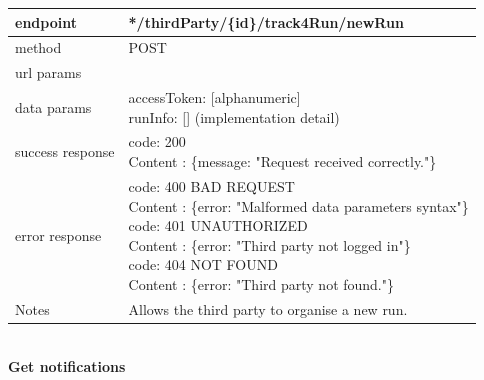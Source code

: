 \begin{legal}
\begin{legal}
\begin{itemize}
								\begin{tabularx}{\linewidth}{| l | l |}
									\hline
									endpoint & */thirdParty/\{id\}/track4Run/newRun \\
									\hline
									method & POST \\
									\hline
									url params & \\
									\hline
									data params &
									\parbox{0.7\textwidth}{
										\bigskip
										accessToken: [alphanumeric]\\
										runInfo: [] (implementation detail)
										\bigskip
									} \\
									\hline
									success response &
									\parbox{0.7\textwidth}{
										\bigskip
										code: 200\\
										Content : \{message: "Request received correctly."\}
										\bigskip
									} \\
									\hline
									error response &
									\parbox{0.7\textwidth}{
										\bigskip
										code: 400 BAD REQUEST \\
										Content : \{error: "Malformed data parameters syntax"\}\\
										code: 401 UNAUTHORIZED \\
										Content : \{error: "Third party not logged in"\}\\
										code: 404 NOT FOUND \\
										Content : \{error: "Third party not found."\}
										\bigskip
									} \\
									\hline
									Notes & 
									\parbox{0.7\textwidth}{
										\bigskip Allows the third party to organise a new run.
									\bigskip}  \\
									\hline
								\end{tabularx}\\
							
								\textbf{Get notifications} \\
			

\end{itemize}
\end{legal}
\end{legal}
